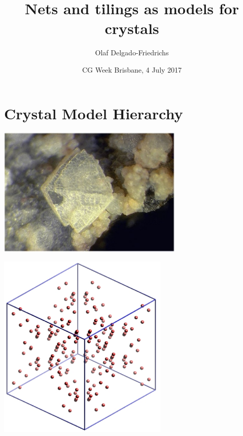 \documentclass{beamer}
\title{Nets and tilings as models for crystals}
\author[Olaf Delgado]{Olaf Delgado-Friedrichs}
\date{CG Week Brisbane, 4 July 2017}
\begin{document}
\begin{frame}
  \titlepage
\end{frame}


\section{Crystal Model Hierarchy}

\begin{frame}
  \begin{center}
    \includegraphics[width=3.5in]{fau-photo.eps}
  \end{center}
\end{frame}

\begin{frame}
  \begin{center}
    \includegraphics[height=3.5in]{fau-atoms.eps}
  \end{center}
\end{frame}
\end{document}
